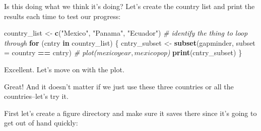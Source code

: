 \documentclass[]{book}
\newenvironment{Shaded}{\begin{snugshade}}{\end{snugshade}}
\newcommand{\KeywordTok}[1]{\textcolor[rgb]{0.13,0.29,0.53}{\textbf{#1}}}
\newcommand{\DataTypeTok}[1]{\textcolor[rgb]{0.13,0.29,0.53}{#1}}
\newcommand{\StringTok}[1]{\textcolor[rgb]{0.31,0.60,0.02}{#1}}
\newcommand{\CommentTok}[1]{\textcolor[rgb]{0.56,0.35,0.01}{\textit{#1}}}
\newcommand{\ControlFlowTok}[1]{\textcolor[rgb]{0.13,0.29,0.53}{\textbf{#1}}}
\newcommand{\OperatorTok}[1]{\textcolor[rgb]{0.81,0.36,0.00}{\textbf{#1}}}
\newcommand{\NormalTok}[1]{#1}
\theoremstyle{definition}
\theoremstyle{definition}
\theoremstyle{definition}
\theoremstyle{remark}
\begin{document}
Is this doing what we think it's doing? Let's create the country list
and print the results each time to test our progress:

\begin{Shaded}
\begin{Highlighting}[]
\NormalTok{country_list <-}\StringTok{ }\KeywordTok{c}\NormalTok{(}\StringTok{"Mexico"}\NormalTok{, }\StringTok{"Panama"}\NormalTok{, }\StringTok{"Ecuador"}\NormalTok{) }\CommentTok{# identify the thing to loop through}
\ControlFlowTok{for}\NormalTok{ (cntry }\ControlFlowTok{in}\NormalTok{ country_list) \{}
\NormalTok{  cntry_subset <-}\StringTok{ }\KeywordTok{subset}\NormalTok{(gapminder, }\DataTypeTok{subset =}\NormalTok{ country }\OperatorTok{==}\StringTok{ }\NormalTok{cntry)  }
  \CommentTok{# plot(mexico$year, mexico$pop)}
  \KeywordTok{print}\NormalTok{(cntry_subset)}
\NormalTok{\} }
\end{Highlighting}
\end{Shaded}

Excellent. Let's move on with the plot.

\begin{Shaded}
\end{Shaded}

Great! And it doesn't matter if we just use these three countries or all
the countries--let's try it.

First let's create a figure directory and make sure it saves there since
it's going to get out of hand quickly:
\end{document}
